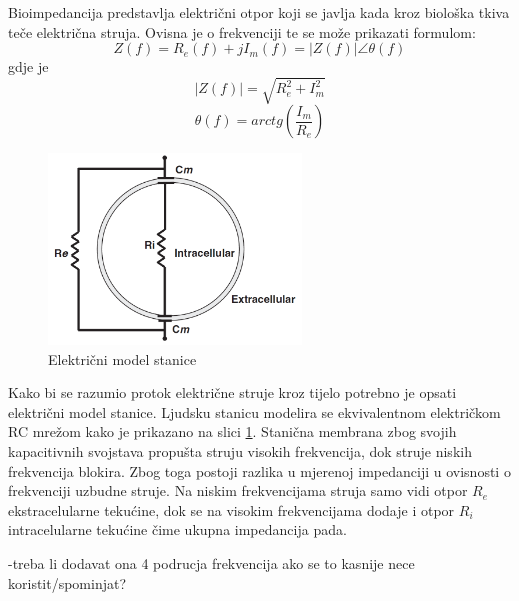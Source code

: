 \documentclass[../diplomski_rad.tex]{subfiles}
\begin{document}
Bioimpedancija predstavlja električni otpor koji se javlja kada kroz biološka tkiva teče električna struja.
Ovisna je o frekvenciji te se može prikazati formulom:
\begin{equation}
    \label{jed:cpe}
    Z(f) = R_{e}(f) + jI_{m}(f) = |Z(f)|\angle\theta(f) 
\end{equation}
gdje je
\begin{equation}
    \label{jed:cpe}
    |Z(f)| = \sqrt{R_{e}^{2} + I_{m}^{2}}
\end{equation} 
\begin{equation}
    \label{jed:cpe}
    \theta(f) = arctg(\frac{I_{m}}{R_{e}})
\end{equation} 

\begin{figure}[htb]
    \centering
    \includegraphics[width=0.6\textwidth]{Figures/stanica.png} 
    \caption{Električni model stanice \cite{Lukaski2013}}
    \label{slk:stanica}
\end{figure}
Kako bi se razumio protok električne struje kroz tijelo potrebno je opsati električni model stanice. 
Ljudsku stanicu modelira se ekvivalentnom električkom RC mrežom \cite{Lukaski2013} kako je prikazano na slici \ref{slk:stanica}.
Stanična membrana zbog svojih kapacitivnih svojstava propušta struju visokih frekvencija, dok struje niskih frekvencija blokira. 
Zbog toga postoji razlika u mjerenoj impedanciji u ovisnosti o frekvenciji uzbudne struje. 
Na niskim frekvencijama struja samo vidi otpor $R_{e}$ ekstracelularne tekućine, dok se na visokim frekvencijama dodaje i otpor 
$R_{i}$ intracelularne tekućine čime ukupna impedancija pada.

-treba li dodavat ona 4 podrucja frekvencija ako se to kasnije nece koristit/spominjat?
\end{document}
